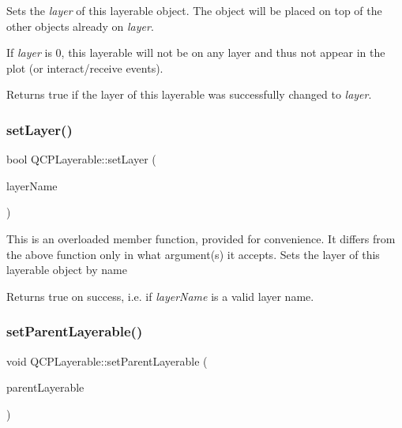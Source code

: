 Sets the {\itshape layer} of this layerable object. The object will be placed on top of the other objects already on {\itshape layer}.

If {\itshape layer} is 0, this layerable will not be on any layer and thus not appear in the plot (or interact/receive events).

Returns true if the layer of this layerable was successfully changed to {\itshape layer}. \mbox{\label{class_q_c_p_layerable_ab25a0e7b897993b44447caee0f142083}} 
\subsubsection{\texorpdfstring{set\+Layer()}{setLayer()}\hspace{0.1cm}{\footnotesize\ttfamily [2/2]}}
{\footnotesize\ttfamily bool Q\+C\+P\+Layerable\+::set\+Layer (\begin{DoxyParamCaption}\item[{const Q\+String \&}]{layer\+Name }\end{DoxyParamCaption})}

This is an overloaded member function, provided for convenience. It differs from the above function only in what argument(s) it accepts. Sets the layer of this layerable object by name

Returns true on success, i.\+e. if {\itshape layer\+Name} is a valid layer name. \mbox{\label{class_q_c_p_layerable_aa23c893671f1f6744ac235cf2204cf3a}} 
\subsubsection{\texorpdfstring{set\+Parent\+Layerable()}{setParentLayerable()}}
{\footnotesize\ttfamily void Q\+C\+P\+Layerable\+::set\+Parent\+Layerable (\begin{DoxyParamCaption}\item[{\hyperlink{class_q_c_p_layerable}{Q\+C\+P\+Layerable} $\ast$}]{parent\+Layerable }\end{DoxyParamCaption})\hspace{0.3cm}{\ttfamily [protected]}}


